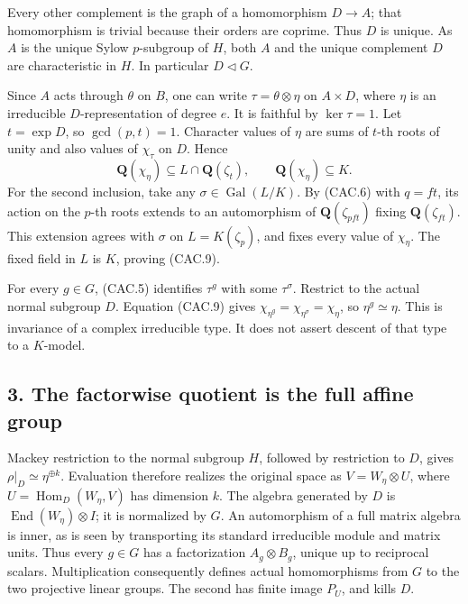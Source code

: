 Every other complement is the graph of a homomorphism \(D\to A\);
that homomorphism is trivial because their orders are coprime.
Thus \(D\) is unique. As \(A\) is the unique Sylow \(p\)-subgroup
of \(H\), both \(A\) and the unique complement \(D\) are
characteristic in \(H\). In particular \(D\triangleleft G\).

Since \(A\) acts through \(\theta\) on \(B\), one can write
\(\tau=\theta\otimes\eta\) on \(A\times D\), where \(\eta\) is
an irreducible \(D\)-representation of degree \(e\).
It is faithful by \(\ker\tau=1\).
Let \(t=\exp D\), so \(\gcd(p,t)=1\). Character values of \(\eta\)
are sums of \(t\)-th roots of unity and also values of \(\chi_\tau\)
on \(D\). Hence
\[
       \mathbf Q(\chi_\eta)\subseteq
       L\cap\mathbf Q(\zeta_t),\qquad
       \mathbf Q(\chi_\eta)\subseteq K.
 \tag{CAC.9}
\]
For the second inclusion, take any
\(\sigma\in\operatorname{Gal}(L/K)\).
By (CAC.6) with \(q=ft\), its action on the \(p\)-th roots
extends to an automorphism of \(\mathbf Q(\zeta_{pft})\) fixing
\(\mathbf Q(\zeta_{ft})\). This extension agrees with \(\sigma\)
on \(L=K(\zeta_p)\), and fixes every value of \(\chi_\eta\).
The fixed field in \(L\) is \(K\), proving (CAC.9).

For every \(g\in G\), (CAC.5) identifies \(\tau^g\) with some
\(\tau^\sigma\). Restrict to the actual normal subgroup \(D\).
Equation (CAC.9) gives
\(\chi_{\eta^g}=\chi_{\eta^\sigma}=\chi_\eta\), so
\(\eta^g\simeq\eta\). This is invariance of a complex irreducible
type. It does not assert descent of that type to a \(K\)-model.

\subsection*{3. The factorwise quotient is the full affine group}

Mackey restriction to the normal subgroup \(H\), followed by
restriction to \(D\), gives
\(\rho|_D\simeq\eta^{\oplus k}\).
Evaluation therefore realizes the original space as
\(V=W_\eta\otimes U\), where
\(U=\operatorname{Hom}_D(W_\eta,V)\) has dimension \(k\).
The algebra generated by \(D\) is
\(\operatorname{End}(W_\eta)\otimes I\); it is normalized by \(G\).
An automorphism of a full matrix algebra is inner, as is seen
by transporting its standard irreducible module and matrix units.
Thus every \(g\in G\) has a factorization \(A_g\otimes B_g\),
unique up to reciprocal scalars. Multiplication consequently
defines actual homomorphisms from \(G\) to the two projective
linear groups. The second has finite image \(P_U\), and kills \(D\).

